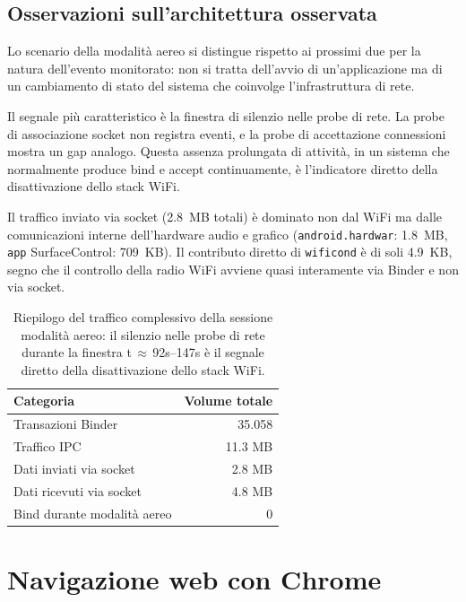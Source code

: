 \subsection{Osservazioni sull'architettura osservata}
\label{subsec:aereo-arch}

Lo scenario della modalità aereo si distingue rispetto ai prossimi due per la natura dell'evento monitorato: non si tratta dell'avvio di un'applicazione ma di un cambiamento di stato del sistema che coinvolge l'infrastruttura di rete.

Il segnale più caratteristico è la finestra di silenzio nelle probe di rete. La probe di associazione socket non registra eventi, e la probe di accettazione connessioni mostra un gap analogo. Questa assenza prolungata di attività, in un sistema che normalmente produce bind e accept continuamente, è l'indicatore diretto della disattivazione dello stack WiFi.

Il traffico inviato via socket (2.8~MB totali) è dominato non dal WiFi ma dalle comunicazioni interne dell'hardware audio e grafico (\texttt{android.hardwar}: 1.8~MB, \texttt{app} SurfaceControl: 709~KB). Il contributo diretto di \texttt{wificond} è di soli 4.9~KB, segno che il controllo della radio WiFi avviene quasi interamente via Binder e non via socket.

\begin{table}[h]
\centering
\begin{tabular}{lr}
\toprule
\textbf{Categoria} & \textbf{Volume totale} \\
\midrule
Transazioni Binder & 35.058 \\
Traffico IPC & 11.3 MB \\
Dati inviati via socket & 2.8 MB \\
Dati ricevuti via socket & 4.8 MB \\
Bind durante modalità aereo & 0 \\
\bottomrule
\end{tabular}
\caption{Riepilogo del traffico complessivo della sessione modalità aereo: il silenzio nelle probe di rete durante la finestra t$\,\approx\,$92s--147s è il segnale diretto della disattivazione dello stack WiFi.}
\end{table}

\section{Navigazione web con Chrome}
\label{sec:chrome}

